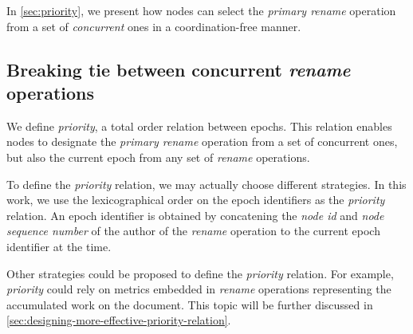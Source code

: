\documentclass[sigplan,10pt]{acmart}
\begin{document}
In \autoref{sec:priority}, we present how nodes can select the \emph{primary rename} operation from a set of \emph{concurrent} ones in a coordination-free manner.

\subsection{Breaking tie between concurrent \emph{rename} operations}
\label{sec:priority}


We define \emph{priority}, a total order relation between epochs.
This relation enables nodes to designate the \emph{primary rename} operation from a set of concurrent ones, but also the current epoch from any set of \emph{rename} operations.

To define the \emph{priority} relation, we may actually choose different strategies.
In this work, we use the lexicographical order on the epoch identifiers as the \emph{priority} relation.
An epoch identifier is obtained by concatening the \emph{node id} and \emph{node sequence number} of the author of the \emph{rename} operation to the current epoch identifier at the time.

Other strategies could be proposed to define the \emph{priority} relation.
For example, \emph{priority} could rely on metrics embedded in \emph{rename} operations representing the accumulated work on the document.
This topic will be further discussed in \autoref{sec:designing-more-effective-priority-relation}.
\end{document}
